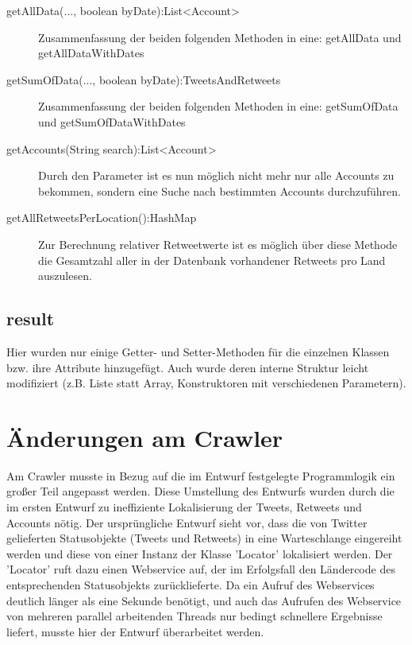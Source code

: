 \begin{itemize}
\begin{description}
		\item[getAllData(..., boolean byDate):List<Account>] Zusammenfassung der beiden folgenden Methoden in eine: getAllData und getAllDataWithDates
		\item[getSumOfData(..., boolean byDate):TweetsAndRetweets] Zusammenfassung der beiden folgenden Methoden in eine: getSumOfData und getSumOfDataWithDates
		\item[getAccounts(String search):List<Account>] Durch den Parameter ist es nun möglich nicht mehr nur alle Accounts zu bekommen, sondern eine Suche nach bestimmten Accounts durchzuführen.
		\item[getAllRetweetsPerLocation():HashMap] Zur Berechnung relativer Retweetwerte ist es möglich über diese Methode die Gesamtzahl aller in der Datenbank vorhandener Retweets pro Land auszulesen.
	\end{description}
\end{itemize}
	
\subsection{result}
Hier wurden nur einige Getter- und Setter-Methoden für die einzelnen Klassen bzw. ihre Attribute hinzugefügt. Auch wurde deren interne Struktur leicht modifiziert (z.B. Liste statt Array, Konstruktoren mit verschiedenen Parametern).

\section{Änderungen am Crawler}
Am Crawler musste in Bezug auf die im Entwurf festgelegte Programmlogik ein großer Teil angepasst werden. Diese Umstellung des Entwurfs wurden durch die im ersten Entwurf zu ineffiziente Lokalisierung der Tweets, Retweets und Accounts nötig. Der ursprüngliche Entwurf sieht vor, dass die von Twitter gelieferten Statusobjekte (Tweets und Retweets) in eine Warteschlange eingereiht werden und diese von einer Instanz der Klasse 'Locator' lokalisiert werden. Der 'Locator' ruft dazu einen Webservice auf, der im Erfolgsfall den Ländercode des entsprechenden Statusobjekts zurücklieferte. Da ein Aufruf des Webservices deutlich länger als eine Sekunde benötigt, und auch das Aufrufen des Webservice von mehreren parallel arbeitenden Threads nur bedingt schnellere Ergebnisse liefert, musste hier der Entwurf überarbeitet werden.

